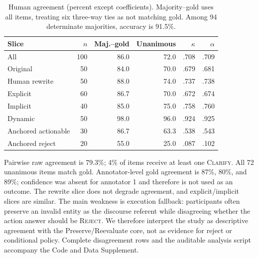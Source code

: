 \documentclass[10pt]{article}
\begin{document}
\begin{table}[H]
\centering
\small
\begin{tabular}{lrrrrr}
\toprule
Slice & $n$ & Maj.--gold & Unanimous & $\kappa$ & $\alpha$\\
\midrule
All & 100 & 86.0 & 72.0 & .708 & .709\\
Original & 50 & 84.0 & 70.0 & .679 & .681\\
Human rewrite & 50 & 88.0 & 74.0 & .737 & .738\\
Explicit & 60 & 86.7 & 70.0 & .672 & .674\\
Implicit & 40 & 85.0 & 75.0 & .758 & .760\\
Dynamic & 50 & 98.0 & 96.0 & .924 & .925\\
Anchored actionable & 30 & 86.7 & 63.3 & .538 & .543\\
Anchored reject & 20 & 55.0 & 25.0 & .087 & .102\\
\bottomrule
\end{tabular}
\caption{Human agreement (percent except coefficients). Majority--gold uses all items, treating
six three-way ties as not matching gold. Among 94 determinate majorities, accuracy is 91.5\%.}
\end{table}

Pairwise raw agreement is 79.3\%; 4\% of items receive at least one \textsc{Clarify}. All 72
unanimous items match gold. Annotator-level gold agreement is 87\%, 80\%, and 89\%; confidence
was absent for annotator 1 and therefore is not used as an outcome. The rewrite slice does not
degrade agreement, and explicit/implicit slices are similar. The main weakness is execution
fallback: participants often preserve an invalid entity as the discourse referent while
disagreeing whether the action answer should be \textsc{Reject}. We therefore interpret the
study as descriptive agreement with the Preserve/Reevaluate core, not as evidence for reject or
conditional policy. Complete disagreement rows and the auditable analysis script accompany the
Code and Data Supplement.
\end{document}
